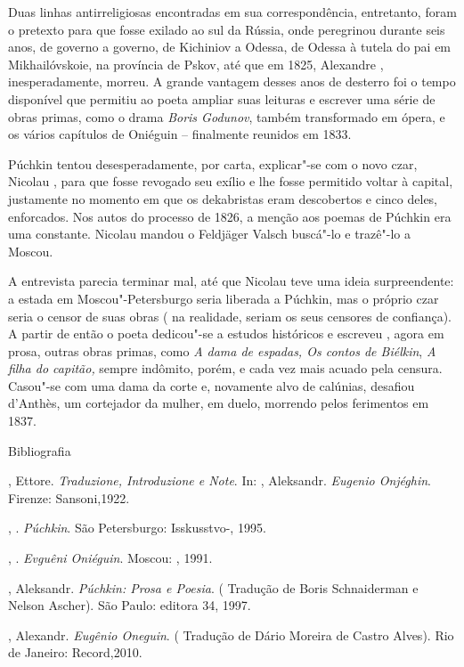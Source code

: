 Duas linhas antirreligiosas encontradas em sua correspondência,
entretanto, foram o pretexto para que fosse exilado ao sul da Rússia,
onde peregrinou durante seis anos, de governo a governo, de Kichiniov a
Odessa, de Odessa à tutela do pai em Mikhailóvskoie, na província de
Pskov, até que em 1825, Alexandre  , inesperadamente, morreu. A grande
vantagem desses anos de desterro foi o tempo disponível que permitiu ao
poeta ampliar suas leituras e escrever uma série de obras primas, como o
drama \emph{Boris Godunov}, também transformado em ópera, e os vários
capítulos de Oniéguin -- finalmente reunidos em 1833.

Púchkin tentou desesperadamente, por carta, explicar"-se com o novo czar,
Nicolau , para que fosse revogado seu exílio e lhe fosse permitido
voltar à capital, justamente no momento em que os dekabristas eram
descobertos e cinco deles, enforcados. Nos autos do processo de 1826, a
menção aos poemas de Púchkin era uma constante. Nicolau mandou o
Feldjäger Valsch buscá"-lo e trazê"-lo a Moscou.

A entrevista parecia terminar mal, até que Nicolau teve uma ideia
surpreendente: a estada em Moscou"-Petersburgo seria liberada a Púchkin,
mas o próprio czar seria o censor de suas obras ( na realidade, seriam
os seus censores de confiança). A partir de então o poeta dedicou"-se a
estudos históricos e escreveu , agora em prosa, outras obras primas,
como \emph{A dama de espadas, Os contos de Biélkin}, \emph{A filha do
capitão,} sempre indômito, porém, e cada vez mais acuado pela censura.
Casou"-se com uma dama da corte e, novamente alvo de calúnias, desafiou
d'Anthès, um cortejador da mulher, em duelo, morrendo pelos ferimentos
em 1837.

Bibliografia

, Ettore. \emph{Traduzione, Introduzione e Note}. In: ,
Aleksandr. \emph{Eugenio Onjéghin}. Firenze: Sansoni,1922.

, . \emph{Púchkin}. São Petersburgo: Isskusstvo-, 1995.

, . \emph{Evguêni Oniéguin}. Moscou: , 1991.

, Aleksandr. \emph{Púchkin: Prosa e Poesia}. ( Tradução de Boris
Schnaiderman e Nelson Ascher). São Paulo: editora 34, 1997.

, Alexandr. \emph{Eugênio Oneguin}. ( Tradução de Dário Moreira
de Castro Alves). Rio de Janeiro: Record,2010.

